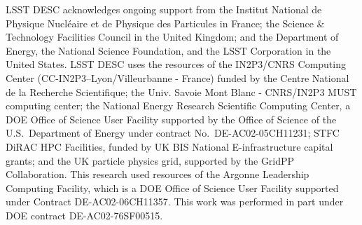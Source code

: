 LSST DESC acknowledges ongoing support from the Institut National de Physique Nucl\'eaire et de Physique des Particules in France; the Science \& Technology Facilities Council in the United Kingdom; and the Department of Energy, the National Science Foundation, and the LSST Corporation in the United States. LSST DESC uses the resources of the IN2P3/CNRS Computing Center (CC-IN2P3--Lyon/Villeurbanne - France) funded by the Centre National de la Recherche Scientifique; the Univ. Savoie Mont Blanc - CNRS/IN2P3 MUST computing center; the National Energy Research Scientific Computing Center, a DOE Office of Science User Facility supported by the Office of Science of the U.S.\ Department of Energy under contract No.\ DE-AC02-05CH11231; STFC DiRAC HPC Facilities, funded by UK BIS National E-infrastructure capital grants; and the UK particle physics grid, supported by the GridPP Collaboration. This research used resources of the Argonne Leadership Computing Facility, which is a DOE Office of Science User Facility supported under Contract DE-AC02-06CH11357. This work was performed in part under DOE contract DE-AC02-76SF00515.
